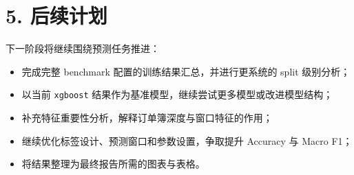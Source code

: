 \documentclass[11pt]{ctexart}
\begin{document}
\section*{5. 后续计划}
下一阶段将继续围绕预测任务推进：
\begin{itemize}[leftmargin=*]
    \item 完成完整 benchmark 配置的训练结果汇总，并进行更系统的 split 级别分析；
    \item 以当前 \texttt{xgboost} 结果作为基准模型，继续尝试更多模型或改进模型结构；
    \item 补充特征重要性分析，解释订单簿深度与窗口特征的作用；
    \item 继续优化标签设计、预测窗口和参数设置，争取提升 Accuracy 与 Macro F1；
    \item 将结果整理为最终报告所需的图表与表格。
\end{itemize}
\end{document}
